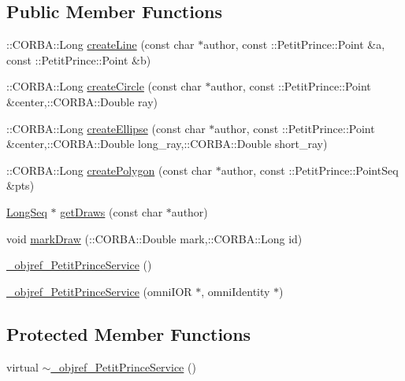 \subsection*{Public Member Functions}
\begin{DoxyCompactItemize}
\item 
\+::C\+O\+R\+B\+A\+::\+Long \hyperlink{class__objref___petit_prince_service_a4a5386891a5ef1e372cd31d2a95406af}{create\+Line} (const char $\ast$author, const \+::Petit\+Prince\+::\+Point \&a, const \+::Petit\+Prince\+::\+Point \&b)
\item 
\+::C\+O\+R\+B\+A\+::\+Long \hyperlink{class__objref___petit_prince_service_a5cbe92155f6bdefee2c940a5b14c1c1c}{create\+Circle} (const char $\ast$author, const \+::Petit\+Prince\+::\+Point \&center,\+::C\+O\+R\+B\+A\+::\+Double ray)
\item 
\+::C\+O\+R\+B\+A\+::\+Long \hyperlink{class__objref___petit_prince_service_aac03628fa5351834885765b5da57ba59}{create\+Ellipse} (const char $\ast$author, const \+::Petit\+Prince\+::\+Point \&center,\+::C\+O\+R\+B\+A\+::\+Double long\+\_\+ray,\+::C\+O\+R\+B\+A\+::\+Double short\+\_\+ray)
\item 
\+::C\+O\+R\+B\+A\+::\+Long \hyperlink{class__objref___petit_prince_service_ae05ed84a30f239d63203bd05109b044a}{create\+Polygon} (const char $\ast$author, const \+::Petit\+Prince\+::\+Point\+Seq \&pts)
\item 
\hyperlink{class_long_seq}{Long\+Seq} $\ast$ \hyperlink{class__objref___petit_prince_service_ad9c13910b354fcd183567d42d78d4db3}{get\+Draws} (const char $\ast$author)
\item 
void \hyperlink{class__objref___petit_prince_service_a2bbaeb6486eec446ae07529c99ca5598}{mark\+Draw} (\+::C\+O\+R\+B\+A\+::\+Double mark,\+::C\+O\+R\+B\+A\+::\+Long id)
\item 
\hyperlink{class__objref___petit_prince_service_a7d5aac87fd2840a8f73b60f6f3f05251}{\+\_\+objref\+\_\+\+Petit\+Prince\+Service} ()
\item 
\hyperlink{class__objref___petit_prince_service_ad866a23da1ed08c867b37697565a4e7e}{\+\_\+objref\+\_\+\+Petit\+Prince\+Service} (omni\+I\+OR $\ast$, omni\+Identity $\ast$)
\end{DoxyCompactItemize}
\subsection*{Protected Member Functions}
\begin{DoxyCompactItemize}
\item 
virtual \hyperlink{class__objref___petit_prince_service_aecc6cc3b5c1bfb4ec356337ac550e89b}{$\sim$\+\_\+objref\+\_\+\+Petit\+Prince\+Service} ()
\end{DoxyCompactItemize}
